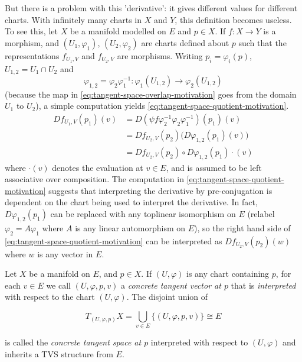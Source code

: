 \documentclass[../main-manifolds.tex]{subfiles}
\begin{document}
But there is a problem with this 'derivative': it gives different values for different charts. With infinitely many charts in $X$ and $Y$, this definition becomes useless. To see this, let $X$ be a manifold modelled on $E$ and $p\in X$. If $f: X\to Y$ is a morphism, and $(U_1,\varphi_1)$, $(U_2,\varphi_2)$ are charts defined about $p$ such that the representations $f_{U_1, V}$ and $f_{U_2, V}$ are morphisms. Writing $p_i = \varphi_i (p)$, $U_{1,2} = U_1\cap U_2$ and
\begin{equation}\label{eq:tangent-space-overlap-motivation}
    \varphi_{1,2}=\varphi_2\varphi_{1}^{-1}: \varphi_1(U_{1,2})\to \varphi_2(U_{1,2})
\end{equation}
(because the map in \cref{eq:tangent-space-overlap-motivation} goes from the domain $U_1$ to $U_2$), a simple computation yields \cref{eq:tangent-space-quotient-motivation}.
\begin{align}
    Df_{U_1, V}(p_1)(v) &= D(\psi f \varphi_2^{-1}\varphi_2\varphi_1^{-1})(p_1)(v) \nonumber\\
    &= Df_{U_2,V}(p_2)\biggl(D\varphi_{1,2}(p_1)(v)\biggr)\nonumber\\
    &= Df_{U_2,V}(p_2)\circ D\varphi_{1,2}(p_1)\cdot (v)\label{eq:tangent-space-quotient-motivation}
\end{align}
where $\cdot(v)$ denotes the evaluation at $v\in E$, and is assumed to be left associative over composition. The computation in \cref{eq:tangent-space-quotient-motivation} suggests that interpreting the derivative by pre-conjugation is dependent on the chart being used to interpret the derivative. In fact, $D\varphi_{1,2}(p_1)$ can be replaced with any toplinear isomorphism on $E$ (relabel $\varphi_2 = A\varphi_1$ where $A$ is any linear automorphism on $E$), so the right hand side of \cref{eq:tangent-space-quotient-motivation} can be interpreted as $Df_{U_2,V}(p_2)(w)$ where $w$ is any vector in $E$. 

\begin{definition}\label{def:concrete-tangent-vector}
    Let $X$ be a manifold on $E$, and $p\in X$. If $(U,\varphi)$ is any chart containing $p$, for each $v\in E$ we call $(U,\varphi,p,v)$ a \emph{concrete tangent vector at $p$} that is \emph{interpreted} with respect to the chart $(U,\varphi)$. The disjoint union of

    \begin{equation}\label{eq:concrete-tangent-space}
        T_{(U,\varphi,p)}X = \bigcup_{v\in E}\{(U,\varphi,p,v)\}\cong E
    \end{equation}

    is called the \emph{concrete tangent space at $p$} interpreted with respect to $(U,\varphi)$ and inherits a TVS structure from $E$.
\end{definition}
\end{document}
